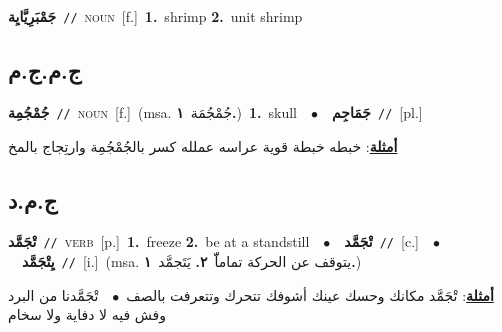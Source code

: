 \documentclass[10pt,a4paper,twoside]{article} %
\begin{document}
\begin{multicols}{2}
{\setlength\topsep{0pt}\textbf{\foreignlanguage{arabic}{جَمْبَرِيَّايِة}}\ {\color{gray}\texttt{//}\color{black}}\ \textsc{noun}\ [f.]\ \textbf{1.}~shrimp  \textbf{2.}~unit shrimp\ } \vspace{2mm}

\vspace{-3mm}
\subsection*{\color{blue}\foreignlanguage{arabic}{ج.م.ج.م}\color{blue}{}} 

{\setlength\topsep{0pt}\textbf{\foreignlanguage{arabic}{جُمْجُمِة}}\ {\color{gray}\texttt{//}\color{black}}\ \textsc{noun}\ [f.]\ \color{gray}(msa. \foreignlanguage{arabic}{جُمْجُمَة}~\foreignlanguage{arabic}{\textbf{١.}})\color{black}\ \textbf{1.}~skull\ \ $\bullet$\ \ \setlength\topsep{0pt}\textbf{\foreignlanguage{arabic}{جَمَاجِم}}\ {\color{gray}\texttt{//}\color{black}}\ [pl.]\  \begin{flushright}\color{gray}\foreignlanguage{arabic}{\textbf{\underline{\foreignlanguage{arabic}{أمثلة}}}: خبطه خبطة قوية عراسه عملله كسر بالجُمْجُمِة وارتِجاج بالمخ}\end{flushright}\color{black}} \vspace{2mm}

\vspace{-3mm}
\subsection*{\color{blue}\foreignlanguage{arabic}{ج.م.د}\color{blue}{}} 

{\setlength\topsep{0pt}\textbf{\foreignlanguage{arabic}{تْجَمَّد}}\ {\color{gray}\texttt{//}\color{black}}\ \textsc{verb}\ [p.]\ \textbf{1.}~freeze  \textbf{2.}~be at a standstill\ \ $\bullet$\ \ \setlength\topsep{0pt}\textbf{\foreignlanguage{arabic}{تْجَمَّد}}\ {\color{gray}\texttt{//}\color{black}}\ [c.]\ \ $\bullet$\ \ \setlength\topsep{0pt}\textbf{\foreignlanguage{arabic}{يِتْجَمَّد}}\ {\color{gray}\texttt{//}\color{black}}\ [i.]\ \color{gray}(msa. \foreignlanguage{arabic}{يتوقف عن الحركة تماماّّ}~\foreignlanguage{arabic}{\textbf{٢.}}  \foreignlanguage{arabic}{يَتَجمَّد}~\foreignlanguage{arabic}{\textbf{١.}})\color{black}\  \begin{flushright}\color{gray}\foreignlanguage{arabic}{\textbf{\underline{\foreignlanguage{arabic}{أمثلة}}}: تْجَمَّد مكانك وحسك عينك أشوفك تتحرك وتتعرفت بالصف\ $\bullet$\ \  تْجَمَّدنا من البرد وفش فيه لا دفاية ولا سخام}\end{flushright}\color{black}} \vspace{2mm}


\end{multicols}
\end{document}

